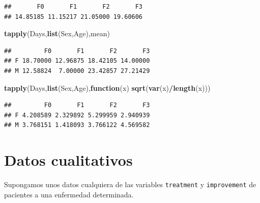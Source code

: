 \documentclass[]{book}
\newenvironment{Shaded}{\begin{snugshade}}{\end{snugshade}}
\newcommand{\KeywordTok}[1]{\textcolor[rgb]{0.13,0.29,0.53}{\textbf{#1}}}
\newcommand{\ControlFlowTok}[1]{\textcolor[rgb]{0.13,0.29,0.53}{\textbf{#1}}}
\newcommand{\OperatorTok}[1]{\textcolor[rgb]{0.81,0.36,0.00}{\textbf{#1}}}
\newcommand{\NormalTok}[1]{#1}
\begin{document}
\begin{verbatim}
##       F0       F1       F2       F3 
## 14.85185 11.15217 21.05000 19.60606
\end{verbatim}

\begin{Shaded}
\begin{Highlighting}[]
\KeywordTok{tapply}\NormalTok{(Days,}\KeywordTok{list}\NormalTok{(Sex,Age),mean)}
\end{Highlighting}
\end{Shaded}

\begin{verbatim}
##         F0       F1       F2       F3
## F 18.70000 12.96875 18.42105 14.00000
## M 12.58824  7.00000 23.42857 27.21429
\end{verbatim}

\begin{Shaded}
\begin{Highlighting}[]
\KeywordTok{tapply}\NormalTok{(Days,}\KeywordTok{list}\NormalTok{(Sex,Age),}\ControlFlowTok{function}\NormalTok{(x) }\KeywordTok{sqrt}\NormalTok{(}\KeywordTok{var}\NormalTok{(x)}\OperatorTok{/}\KeywordTok{length}\NormalTok{(x)))}
\end{Highlighting}
\end{Shaded}

\begin{verbatim}
##         F0       F1       F2       F3
## F 4.208589 2.329892 5.299959 2.940939
## M 3.768151 1.418093 3.766122 4.569582
\end{verbatim}

\section{Datos cualitativos}\label{datos-cualitativos}

Supongamos unos datos cualquiera de las variables \texttt{treatment} y
\texttt{improvement} de pacientes a una enfermedad determinada.
\end{document}
